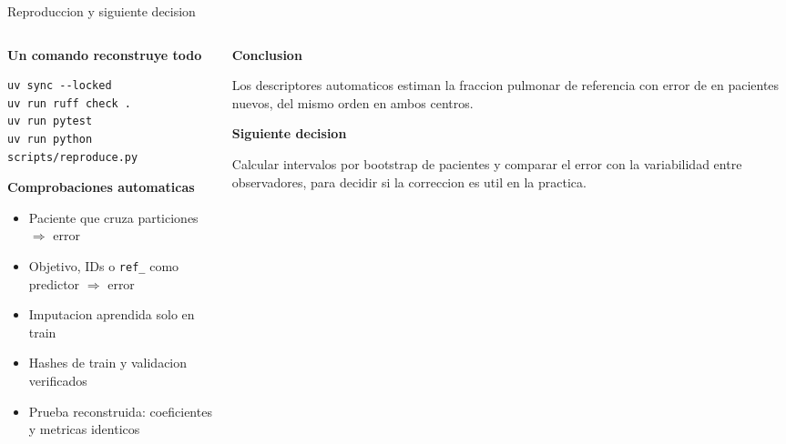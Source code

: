 \documentclass[11pt]{beamer}
\begin{document}
\begin{frame}[fragile]{Reproduccion y siguiente decision}
\footnotesize
\begin{columns}[T]
\begin{column}{0.52\textwidth}
\textbf{Un comando reconstruye todo}
\scriptsize
\begin{verbatim}
uv sync --locked
uv run ruff check .
uv run pytest
uv run python scripts/reproduce.py
\end{verbatim}

\textbf{Comprobaciones automaticas}
\begin{itemize}
    \item Paciente que cruza particiones $\Rightarrow$ error
    \item Objetivo, IDs o \texttt{ref\_} como predictor $\Rightarrow$ error
    \item Imputacion aprendida solo en train
    \item Hashes de train y validacion verificados
    \item Prueba reconstruida: coeficientes y metricas identicos
\end{itemize}
\end{column}

\begin{column}{0.46\textwidth}
\textbf{Conclusion}
\scriptsize

Los descriptores automaticos estiman la fraccion pulmonar de referencia
con error de \ModRMSETest{} en pacientes nuevos, del mismo orden en ambos
centros.

\vspace{0.3cm}
\textbf{Siguiente decision}

Calcular intervalos por bootstrap de pacientes y comparar el error con la
variabilidad entre observadores, para decidir si la correccion es util en
la practica.
\end{column}
\end{columns}
\end{frame}
\end{document}

